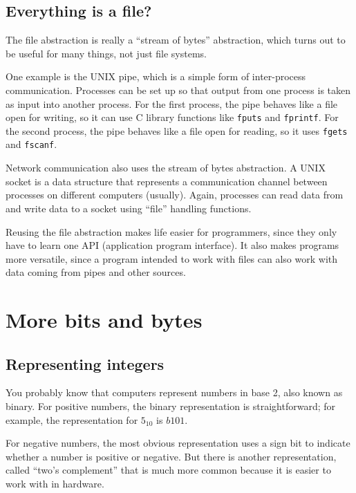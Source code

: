 \documentclass[12pt]{book}
\begin{document}
{\section{Everything is a file?}

The file abstraction is really a ``stream of bytes'' abstraction,
which turns out to be useful for many things, not just file systems.

One example is the UNIX pipe, which is a simple form of inter-process
communication.  Processes can be set up so that output from one
process is taken as input into another process.  For the first
process, the pipe behaves like a file open for writing, so it
can use C library functions like {\tt fputs} and {\tt fprintf}.
For the second process, the pipe behaves like a file open for
reading, so it uses {\tt fgets} and {\tt fscanf}.

Network communication also uses the stream of bytes abstraction.
A UNIX socket is a data structure that represents a communication
channel between processes on different computers (usually).  Again,
processes can read data from and write data to a socket using
``file'' handling functions.

Reusing the file abstraction makes life easier for programmers, since
they only have to learn one API (application program interface).
It also makes programs more versatile, since a program intended to
work with files can also work with data coming from pipes and other
sources.



\chapter{More bits and bytes}

\section{Representing integers}

You probably know that computers represent numbers in
base 2, also known as binary.  For positive numbers, the binary
representation is straightforward; for example, the representation
for $5_{10}$ is $b101$.

For negative numbers, the most obvious representation uses
a sign bit to indicate whether a number is positive or negative.
But there is another representation, called ``two's complement''
that is much more common because it is easier to work with
in hardware.

}
\end{document}
